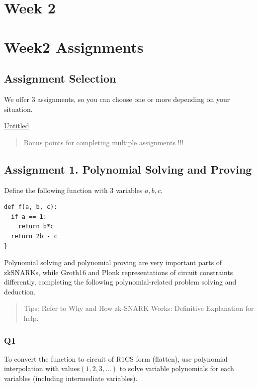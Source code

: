 \documentclass[11pt]{article}
\author{Josh Kwok}
\date{\today}
\title{}
\begin{document}
\tableofcontents \clearpage\section{Week 2}
\label{week-2}
\section{Week2 Assignments}
\label{week2-assignments}
\subsection{Assignment Selection}
\label{assignment-selection}
We offer 3 assignments, so you can choose one or more depending on your situation.

\href{https://www.notion.so/dc0c5f6e11c441779bed71ec77cd7118}{Untitled}

\begin{quote}
Bonus points for completing multiple assignments !!!
\end{quote}

\subsection{Assignment 1. Polynomial Solving and Proving}
\label{assignment-1.-polynomial-solving-and-proving}
Define the following function with 3 variables \(a, b, c\).

\begin{verbatim}
def f(a, b, c):
  if a == 1:
    return b*c
  return 2b - c
}
\end{verbatim}

Polynomial solving and polynomial proving are very important parts of zkSNARKs, while Groth16 and Plonk representations of circuit constraints differently, completing the following polynomial-related problem solving and deduction.

\begin{quote}
Tips: Refer to Why and How zk-SNARK Works: Definitive Explanation for help.
\end{quote}

\subsubsection{Q1}
\label{q1}
To convert the function to circuit of R1CS form (flatten), use polynomial interpolation with values\((1,2,3,...)\) to solve variable polynomials for each variables (including intermediate variables).
\end{document}
